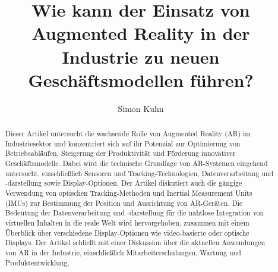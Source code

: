 \documentclass[conference]{IEEEtran}
\title{ Wie kann der Einsatz von Augmented Reality in der Industrie zu neuen Geschäftsmodellen führen?}
\author{{\Large Simon Kuhn}}
\begin{document}
\maketitle
\begin{abstract}
	Dieser Artikel untersucht die wachsende Rolle von Augmented Reality (AR) im Industriesektor und konzentriert sich auf ihr Potenzial zur Optimierung von Betriebsabläufen, Steigerung der Produktivität und Förderung innovativer Geschäftsmodelle. Dabei wird die technische Grundlage von AR-Systemen eingehend untersucht, einschließlich Sensoren und Tracking-Technologien, Datenverarbeitung und -darstellung sowie Display-Optionen. Der Artikel diskutiert auch die gängige Verwendung von optischen Tracking-Methoden und Inertial Measurement Units (IMUs) zur Bestimmung der Position und Ausrichtung von AR-Geräten. Die Bedeutung der Datenverarbeitung und -darstellung für die nahtlose Integration von virtuellen Inhalten in die reale Welt wird hervorgehoben, zusammen mit einem Überblick über verschiedene Display-Optionen wie video-basierte oder optische Displays. Der Artikel schließt mit einer Diskussion über die aktuellen Anwendungen von AR in der Industrie, einschließlich Mitarbeiterschulungen, Wartung und Produktentwicklung.
\end{abstract}






\printbibliography
\end{document}
